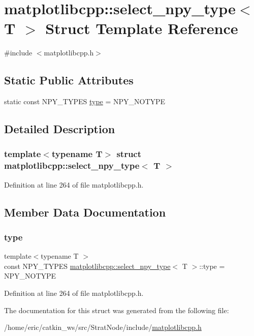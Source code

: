 \hypertarget{structmatplotlibcpp_1_1select__npy__type}{}\section{matplotlibcpp\+::select\+\_\+npy\+\_\+type$<$ T $>$ Struct Template Reference}
\label{structmatplotlibcpp_1_1select__npy__type}


{\ttfamily \#include $<$matplotlibcpp.\+h$>$}

\subsection*{Static Public Attributes}
\begin{DoxyCompactItemize}
\item 
static const N\+P\+Y\+\_\+\+T\+Y\+P\+ES \mbox{\hyperlink{structmatplotlibcpp_1_1select__npy__type_acbffa4e6e1d047b52e12330446816c9c}{type}} = N\+P\+Y\+\_\+\+N\+O\+T\+Y\+PE
\end{DoxyCompactItemize}


\subsection{Detailed Description}
\subsubsection*{template$<$typename T$>$\newline
struct matplotlibcpp\+::select\+\_\+npy\+\_\+type$<$ T $>$}



Definition at line 264 of file matplotlibcpp.\+h.



\subsection{Member Data Documentation}
\mbox{\label{structmatplotlibcpp_1_1select__npy__type_acbffa4e6e1d047b52e12330446816c9c}} 
\subsubsection{\texorpdfstring{type}{type}}
{\footnotesize\ttfamily template$<$typename T $>$ \\
const N\+P\+Y\+\_\+\+T\+Y\+P\+ES \mbox{\hyperlink{structmatplotlibcpp_1_1select__npy__type}{matplotlibcpp\+::select\+\_\+npy\+\_\+type}}$<$ T $>$\+::type = N\+P\+Y\+\_\+\+N\+O\+T\+Y\+PE\hspace{0.3cm}{\ttfamily [static]}}



Definition at line 264 of file matplotlibcpp.\+h.



The documentation for this struct was generated from the following file\+:\begin{DoxyCompactItemize}
\item 
/home/eric/catkin\+\_\+ws/src/\+Strat\+Node/include/\mbox{\hyperlink{matplotlibcpp_8h}{matplotlibcpp.\+h}}\end{DoxyCompactItemize}

